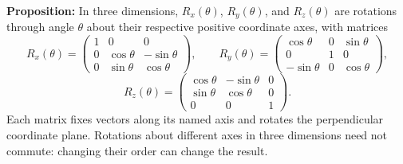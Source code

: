 \documentclass[a4paper,11pt,abstract=true]{scrartcl}
\theoremstyle{dotlessP}
\theoremstyle{dotlessS}
\theoremstyle{remark}
\theoremstyle{definition}
\begin{document}
\begin{problem_box}
\textbf{Proposition:}
In three dimensions, $R_x(\theta)$, $R_y(\theta)$, and $R_z(\theta)$
are rotations through angle $\theta$ about their respective positive
coordinate axes, with matrices
\[
R_x(\theta)=
\begin{pmatrix}
1&0&0\\
0&\cos\theta&-\sin\theta\\
0&\sin\theta&\cos\theta
\end{pmatrix},\qquad
R_y(\theta)=
\begin{pmatrix}
\cos\theta&0&\sin\theta\\
0&1&0\\
-\sin\theta&0&\cos\theta
\end{pmatrix},
\]
\[
R_z(\theta)=
\begin{pmatrix}
\cos\theta&-\sin\theta&0\\
\sin\theta&\cos\theta&0\\
0&0&1
\end{pmatrix}.
\]
Each matrix fixes vectors along its named axis and rotates the
perpendicular coordinate plane. Rotations about different axes in
three dimensions need not commute: changing their order can change the
result.
\end{problem_box}
\end{document}
